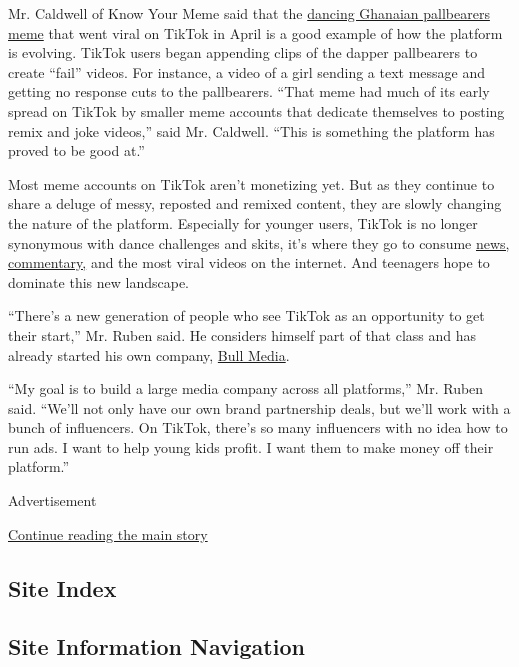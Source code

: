 Mr. Caldwell of Know Your Meme said that the
\href{https://knowyourmeme.com/memes/coffin-dance-dancing-pallbearers}{dancing
Ghanaian pallbearers meme} that went viral on TikTok in April is a good
example of how the platform is evolving. TikTok users began appending
clips of the dapper pallbearers to create ``fail'' videos. For instance,
a video of a girl sending a text message and getting no response cuts to
the pallbearers. ``That meme had much of its early spread on TikTok by
smaller meme accounts that dedicate themselves to posting remix and joke
videos,'' said Mr. Caldwell. ``This is something the platform has proved
to be good at.''

Most meme accounts on TikTok aren't monetizing yet. But as they continue
to share a deluge of messy, reposted and remixed content, they are
slowly changing the nature of the platform. Especially for younger
users, TikTok is no longer synonymous with dance challenges and skits,
it's where they go to consume
\href{https://www.nytimes.com/2020/02/27/style/tiktok-politics-bernie-trump.html}{news,
commentary,} and the most viral videos on the internet. And teenagers
hope to dominate this new landscape.

``There's a new generation of people who see TikTok as an opportunity to
get their start,'' Mr. Ruben said. He considers himself part of that
class and has already started his own company,
\href{https://bullmediagroup.co/}{Bull Media}.

``My goal is to build a large media company across all platforms,'' Mr.
Ruben said. ``We'll not only have our own brand partnership deals, but
we'll work with a bunch of influencers. On TikTok, there's so many
influencers with no idea how to run ads. I want to help young kids
profit. I want them to make money off their platform.''

Advertisement

\protect\hyperlink{after-bottom}{Continue reading the main story}

\hypertarget{site-index}{%
\subsection{Site Index}\label{site-index}}

\hypertarget{site-information-navigation}{%
\subsection{Site Information
Navigation}\label{site-information-navigation}}

